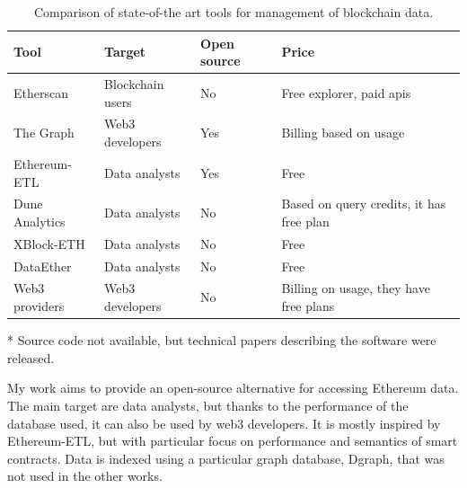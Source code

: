 \begin{table}[ht!]
\centering
    \begin{threeparttable}
    \begin{tabular}  { m{3cm} m{3cm} m{1.5cm} m{5cm} } 
    \toprule
    \textbf{Tool} & \textbf{Target} & \textbf{Open source} & \textbf{Price}  \\
    \midrule
    Etherscan    & Blockchain users  & No & Free explorer, paid apis  \\[2.3ex]
    The Graph     & Web3 developers & Yes & Billing based on usage  \\[1.3ex]
    Ethereum-ETL     & Data analysts & Yes & Free  \\[1.3ex]
    Dune Analytics      & Data analysts & No & Based on query credits, it has free plan \\[2.6ex]
    XBlock-ETH  & Data analysts & No\tnote{*} & Free   \\[1.3ex]
    DataEther  & Data analysts & No\tnote{*} & Free   \\[1.3ex]
    Web3 providers      & Web3 developers & No & Billing on usage, they have free plans   \\[1.6ex]
    \bottomrule
    \end{tabular}
    \begin{tablenotes}
      \item[*] Source code not available, but technical papers describing the software were released.
      \end{tablenotes}
    \end{threeparttable}
\caption[State of the art tools comparison]{Comparison of state-of-the art tools for management of blockchain data.}
\label{table:tools-comparison}
\end{table}

My work aims to provide an open-source alternative for accessing Ethereum data. The main target are data analysts, but thanks to the performance of the database used, it can also be used by web3 developers. It is mostly inspired by Ethereum-ETL, but with particular focus on performance and semantics of smart contracts. Data is indexed using a particular graph database, Dgraph, that was not used in the other works.
